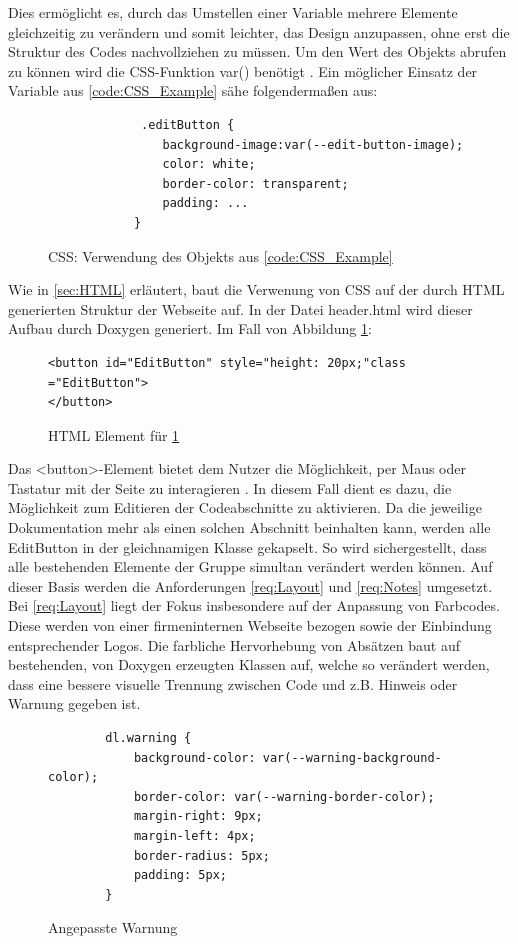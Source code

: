 \documentclass[11pt,a4paper]{report}
\begin{document}
\noindent
Dies ermöglicht es, durch das Umstellen einer Variable mehrere Elemente gleichzeitig zu verändern und somit leichter, das Design anzupassen, ohne erst die Struktur des Codes nachvollziehen zu müssen. Um den Wert des Objekts abrufen zu können wird die CSS-Funktion var() benötigt \cite{CSS_var_funktion}. Ein möglicher Einsatz der Variable aus \ref{code:CSS_Example} sähe folgendermaßen aus:
\begin{figure}[h]
    \centering
    \begin{verbatim}
             .editButton {
                background-image:var(--edit-button-image);
                color: white;
                border-color: transparent;
                padding: ...
            }     
    \end{verbatim}
    \caption{CSS: Verwendung des Objekts aus \ref{code:CSS_Example}}
    \label{code:CSS_Example_Advanced}
\end{figure}

\noindent
Wie in \ref{sec:HTML} erläutert, baut die Verwenung von CSS auf der durch HTML generierten Struktur der Webseite auf. In der Datei \glqq header.html \grqq{} wird dieser Aufbau durch Doxygen generiert. Im Fall von Abbildung \ref{code:CSS_Example_Advanced}:
\begin{figure}[h]
    \centering
    \begin{verbatim}
<button id="EditButton" style="height: 20px;"class ="EditButton">
</button>
    \end{verbatim}
    \caption{HTML Element für \ref{code:CSS_Example_Advanced}}
    \label{code:HTML_Element_für_side_nav}
\end{figure}

\noindent
Das <button>-Element bietet dem Nutzer die Möglichkeit, per Maus oder Tastatur mit der Seite zu interagieren \cite{Button_Element}. In diesem Fall dient es dazu, die Möglichkeit zum Editieren der Codeabschnitte zu aktivieren. Da die jeweilige Dokumentation mehr als einen solchen Abschnitt beinhalten kann, werden alle \glqq EditButton \grqq{} in der gleichnamigen Klasse gekapselt. So wird sichergestellt, dass alle bestehenden Elemente der Gruppe simultan verändert werden können.
Auf dieser Basis werden die Anforderungen \ref{req:Layout} und \ref{req:Notes} umgesetzt. Bei \ref{req:Layout} liegt der Fokus insbesondere auf der Anpassung von Farbcodes. Diese werden von einer firmeninternen Webseite bezogen sowie der Einbindung entsprechender Logos. Die farbliche Hervorhebung von Absätzen baut auf bestehenden, von Doxygen erzeugten Klassen auf, welche so verändert werden, dass eine bessere visuelle Trennung zwischen Code und z.B. Hinweis oder Warnung gegeben ist.
\begin{figure}[h]
    \centering
    \begin{verbatim}
        dl.warning {
            background-color: var(--warning-background-color);
            border-color: var(--warning-border-color);
            margin-right: 9px;
            margin-left: 4px;
            border-radius: 5px;
            padding: 5px;
        }
    \end{verbatim}
    \caption{Angepasste Warnung}
    \label{fig:warning_example}
\end{figure}
\end{document}
